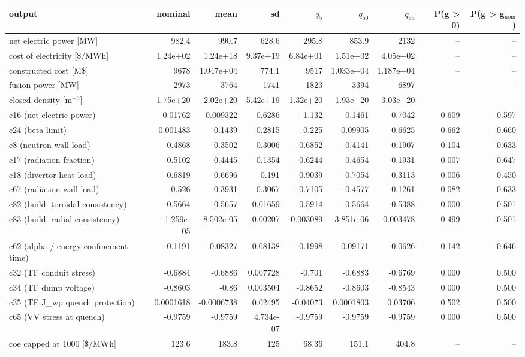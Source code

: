 \begin{tabular}{lrrrrrrrr}
\toprule
output & nominal & mean & sd & $q_{5}$ & $q_{50}$ & $q_{95}$ & P(g > 0) & P(g > g$_\mathrm{nom}$) \\
\midrule
net electric power [MW] & 982.4 & 990.7 & 628.6 & 295.8 & 853.9 & 2132 & -- & -- \\
cost of electricity [\$/MWh] & 1.24e+02 & 1.24e+18 & 9.37e+19 & 6.84e+01 & 1.51e+02 & 4.05e+02 & -- & -- \\
constructed cost [M\$] & 9678 & 1.047e+04 & 774.1 & 9517 & 1.033e+04 & 1.187e+04 & -- & -- \\
fusion power [MW] & 2973 & 3764 & 1741 & 1823 & 3394 & 6897 & -- & -- \\
closed density [m$^{-3}$] & 1.75e+20 & 2.02e+20 & 5.42e+19 & 1.32e+20 & 1.93e+20 & 3.03e+20 & -- & -- \\
c16 (net electric power) & 0.01762 & 0.009322 & 0.6286 & -1.132 & 0.1461 & 0.7042 & 0.609 & 0.597 \\
c24 (beta limit) & 0.001483 & 0.1439 & 0.2815 & -0.225 & 0.09905 & 0.6625 & 0.662 & 0.660 \\
c8 (neutron wall load) & -0.4868 & -0.3502 & 0.3006 & -0.6852 & -0.4141 & 0.1907 & 0.104 & 0.633 \\
c17 (radiation fraction) & -0.5102 & -0.4445 & 0.1354 & -0.6244 & -0.4654 & -0.1931 & 0.007 & 0.647 \\
c18 (divertor heat load) & -0.6819 & -0.6696 & 0.191 & -0.9039 & -0.7054 & -0.3113 & 0.006 & 0.450 \\
c67 (radiation wall load) & -0.526 & -0.3931 & 0.3067 & -0.7105 & -0.4577 & 0.1261 & 0.082 & 0.633 \\
c82 (build: toroidal consistency) & -0.5664 & -0.5657 & 0.01659 & -0.5914 & -0.5664 & -0.5388 & 0.000 & 0.501 \\
c83 (build: radial consistency) & -1.259e-05 & 8.502e-05 & 0.00207 & -0.003089 & -3.851e-06 & 0.003478 & 0.499 & 0.501 \\
c62 (alpha / energy confinement time) & -0.1191 & -0.08327 & 0.08138 & -0.1998 & -0.09171 & 0.0626 & 0.142 & 0.646 \\
c32 (TF conduit stress) & -0.6884 & -0.6886 & 0.007728 & -0.701 & -0.6883 & -0.6769 & 0.000 & 0.500 \\
c34 (TF dump voltage) & -0.8603 & -0.86 & 0.003504 & -0.8652 & -0.8603 & -0.8543 & 0.000 & 0.500 \\
c35 (TF J\_wp quench protection) & 0.0001618 & -0.0006738 & 0.02495 & -0.04073 & 0.0001803 & 0.03706 & 0.502 & 0.500 \\
c65 (VV stress at quench) & -0.9759 & -0.9759 & 4.734e-07 & -0.9759 & -0.9759 & -0.9759 & 0.000 & 0.500 \\
coe capped at 1000 [\$/MWh] & 123.6 & 183.8 & 125 & 68.36 & 151.1 & 404.8 & -- & -- \\
\bottomrule
\end{tabular}
